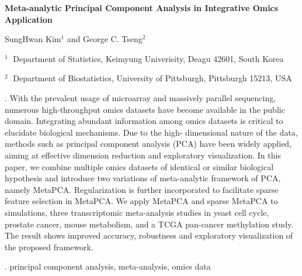 \documentclass[12pt]{article}
\begin{document}
\begin{flushleft}


{\LARGE\bf Meta-analytic Principal Component Analysis in Integrative Omics Application}


\vspace{1.0cm}

SungHwan Kim$^1$ and George C. Tseng$^2$

\begin{description}

\item $^1 \;$ Department of Statistics, Keimyung Univerisity, Deagu 42601, South Korea

\item $^2 \;$ Department of Biostatistics, University of Pittsburgh, Pittsburgh 15213, USA

\end{description}

\end{flushleft}


\vspace{0.75cm}

. With the prevalent usage of microarray and massively parallel sequencing, numerous high-throughput omics datasets have become available in the public domain. Integrating abundant information among omics datasets is critical to elucidate biological mechanisms. Due to the high- dimensional nature of the data, methods such as principal component analysis (PCA) have been widely applied, aiming at effective dimension reduction and exploratory visualization. In this paper, we combine multiple omics datasets of identical or similar biological hypothesis and introduce two variations of meta-analytic framework of PCA, namely MetaPCA. Regularization is further incorporated to facilitate sparse feature selection in MetaPCA. We apply MetaPCA and sparse MetaPCA to simulations, three transcriptomic meta-analysis studies in yeast cell cycle, prostate cancer, mouse metabolism, and a TCGA pan-cancer methylation study. The result shows improved accuracy, robustness and exploratory visualization of the proposed framework.

\vskip 2mm

.
principal component analysis, meta-analysis, omics data
\end{document}
